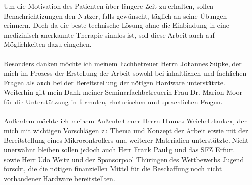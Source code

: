 Um die Motivation des Patienten über längere Zeit zu erhalten, sollen Benachrichtigungen den Nutzer, falls gewünscht, täglich an seine Übungen erinnern. Doch da die beste technische Lösung ohne die Einbindung in eine medizinisch anerkannte Therapie sinnlos ist, soll diese Arbeit auch auf Möglichkeiten dazu eingehen. \\ \\
Besonders danken möchte ich meinem Fachbetreuer Herrn Johannes Süpke, der mich im Prozess der Erstellung der Arbeit sowohl bei inhaltlichen und fachlichen Fragen als auch bei der Bereitstellung der nötigen Hardware unterstützte. Weiterhin gilt mein Dank meiner Seminarfachbetreuerin Frau Dr. Marion Moor für die Unterstützung in formalen, rhetorischen und sprachlichen Fragen. \\ \\
Außerdem möchte ich meinem Außenbetreuer Herrn Hannes Weichel danken, der mich mit wichtigen Vorschlägen zu Thema und Konzept der Arbeit sowie mit der Bereitstellung eines Mikrocontrollers und weiterer Materialien unterstützte. Nicht unerwähnt bleiben sollen jedoch auch Herr Frank Paulig und das SFZ Erfurt sowie Herr Udo Weitz und der Sponsorpool Thüringen des Wettbewerbs \glqq Jugend forscht\grqq , die die nötigen finanziellen Mittel für die Beschaffung noch nicht vorhandener Hardware bereitstellten.